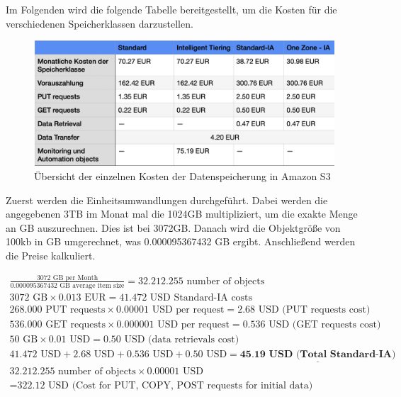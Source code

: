 Im Folgenden wird die folgende Tabelle bereitgestellt, um die Kosten für die verschiedenen Speicherklassen darzustellen.

\begin{figure}[h]
\centering
\includegraphics[width=12cm,keepaspectratio]{Pictures/AWSKostenOhneGesamt.png}
\caption{Übersicht der einzelnen Kosten der Datenspeicherung in Amazon S3}	
\end{figure}

Zuerst werden die Einheitsumwandlungen durchgeführt. Dabei werden die angegebenen 3TB im Monat mal die 1024GB multipliziert, um die exakte Menge an GB auszurechnen. Dies ist bei 3072GB. Danach wird die Objektgröße von 100kb in GB umgerechnet, was 0.000095367432 GB ergibt. Anschließend werden die Preise kalkuliert. 

\newpage

\begin{align}
	\frac{3072 \text{ GB per Month}}{0.000095367432 \text{ GB average item size}} = 32.212.255 \text{ number of objects}\\
	3072 \text{ GB} \times 0.013 \text{ EUR} = \text{41.472 USD Standard-IA costs}\\
	268.000 \text{ PUT requests} \times 0.00001 \text{ USD per request} = 2.68 \text{ USD (PUT requests cost)}\\
	536.000 \text{ GET requests} \times 0.000001 \text{ USD per request} = 0.536 \text{ USD (GET requests cost)}\\
	50 \text{ GB} \times 0.01 \text{ USD} = 0.50 \text{ USD (data retrievals cost)}\\
	41.472 \text{ USD} + 2.68 \text{ USD} + 0.536 \text{ USD} + 0.50 \text{ USD} = \underline{\textbf{45.19  USD (Total Standard-IA)}}\\
	32.212.255 \text{ number of objects} \times 0.00001 \text{ USD} \\ = \text{322.12 USD (Cost for PUT, COPY, POST requests for initial data)}
\end{align}

